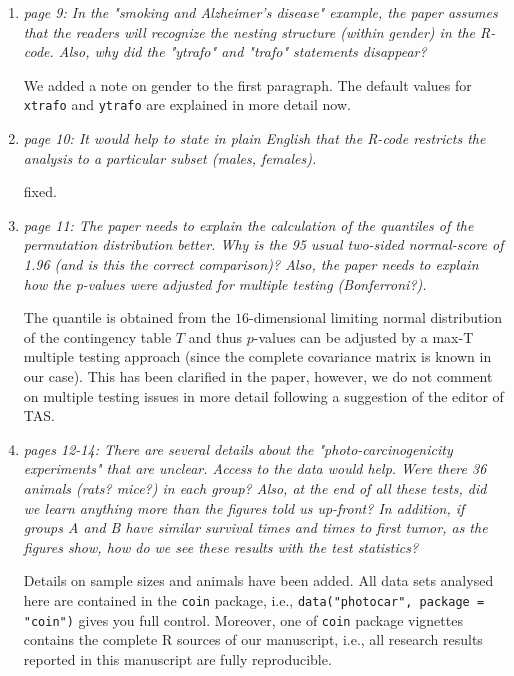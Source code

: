 \documentclass[11pt]{article}
\begin{document}
\begin{enumerate}
\item \textsl{page 9:  In the "smoking and Alzheimer's disease" example, the paper assumes that the 
              readers will recognize the nesting structure (within gender) in the R-code. Also, 
              why did the "ytrafo" and "trafo" statements disappear? }
 
We added a note on gender to the first paragraph. The default values for
\texttt{xtrafo} and \texttt{ytrafo} are explained in more detail now.

\item \textsl{page 10:  It would help to state in plain English that the R-code restricts the 
              analysis to a particular subset (males, females).}
 
fixed.

\item \textsl{page 11:  The paper needs to explain the calculation of the quantiles of the 
              permutation distribution better. Why is the 95%
              usual two-sided normal-score of 1.96 (and is this the correct comparison)? Also, 
              the paper needs to explain how the p-values were adjusted for multiple testing 
              (Bonferroni?).}

The quantile is obtained from the $16$-dimensional limiting normal distribution
of the contingency table $T$ and thus $p$-values can be adjusted by a
max-T multiple testing approach (since the complete covariance matrix is
known in our case). This has been clarified in the paper, however, we do not
comment on multiple testing issues in more detail following a suggestion of
the editor of TAS.
 
\item \textsl{pages 12-14:  There are several details about the "photo-carcinogenicity experiments" 
              that are unclear. Access to the data would help. Were there 36 animals (rats? mice?) 
              in each group? Also, at the end of all these tests, did we learn anything more than the 
              figures told us up-front? 
              In addition, if groups A and B have similar survival times and times to first tumor, 
              as the figures show, how do we see these results with the test statistics? }

Details on sample sizes and animals have been added. All data sets analysed
here are contained in the \texttt{coin} package, i.e., \texttt{data("photocar", package =
"coin")} gives you full control. Moreover, one of \texttt{coin} package
vignettes contains the complete \textsf{R} sources of our manuscript, i.e.,
all research results reported in this manuscript are fully reproducible.


\end{enumerate}
\end{document}

